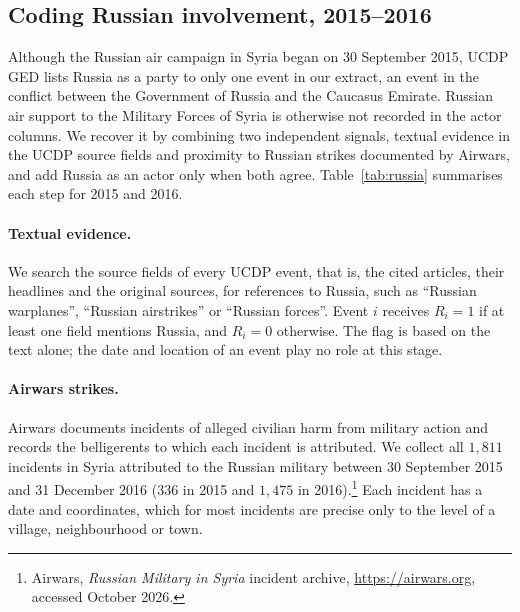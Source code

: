 \subsection{Coding Russian involvement, 2015--2016}
\label{app:russia}

Although the Russian air campaign in Syria began on 30 September 2015, UCDP
GED lists Russia as a party to only one event in our extract, an event in the
conflict between the Government of Russia and the Caucasus Emirate. Russian
air support to the Military Forces of Syria is otherwise not recorded in the
actor columns. We recover it by combining two independent signals, textual
evidence in the UCDP source fields and proximity to Russian strikes documented
by Airwars, and add Russia as an actor only when both agree.
Table~\ref{tab:russia} summarises each step for 2015 and 2016.

\paragraph{Textual evidence.}
We search the source fields of every UCDP event, that is, the cited articles,
their headlines and the original sources, for references to Russia, such as ``Russian warplanes'', ``Russian airstrikes'' or ``Russian
forces''. Event $i$ receives $R_i=1$ if at least one field mentions Russia,
and $R_i=0$ otherwise. The flag is based on the text alone; the date and
location of an event play no role at this stage.

\paragraph{Airwars strikes.}
Airwars documents incidents of alleged civilian harm from military action and
records the belligerents to which each incident is attributed. We collect all
$1{,}811$ incidents in Syria attributed to the Russian military between
30 September 2015 and 31 December 2016 ($336$ in 2015 and $1{,}475$ in
2016).\footnote{Airwars, \emph{Russian Military in Syria} incident archive,
\url{https://airwars.org}, accessed October 2026.} Each incident has a date and
coordinates, which for most incidents are precise only to the level of a
village, neighbourhood or town.

